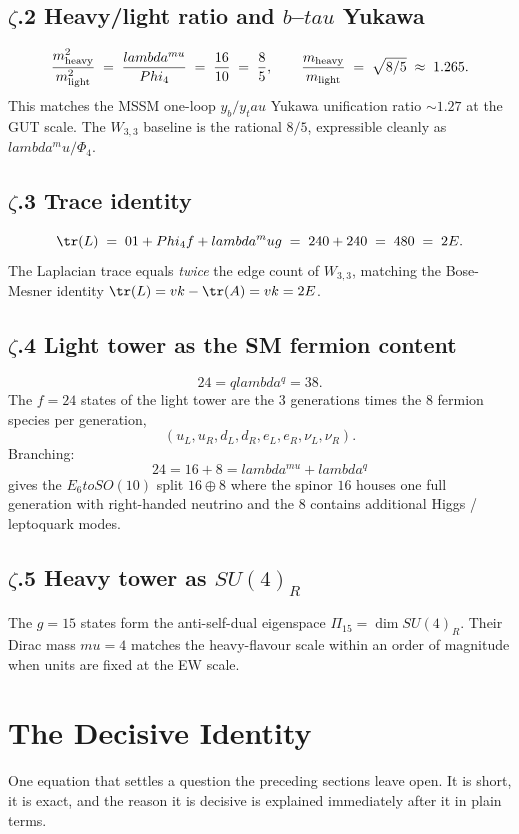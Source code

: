 \documentclass[12pt,a4paper]{article}
\def\mathrm#1{#1}%
\def\mathbf#1{#1}%
\def\lambda{lambda}%
\def\mu{mu}%
\def\Phi#1{Phi#1}%
\def\tau{tau}%
\def\cdot{ }%
\def\to{ to }%
\theoremstyle{definition}
\newcommand{\SU}{\mathrm{SU}}
\begin{document}
\subsection*{$\zeta$.2 \quad Heavy/light ratio and $b$--$\tau$ Yukawa}
\[
\frac{m_{\rm heavy}^2}{m_{\rm light}^2} \;=\; \frac{\lambda^{\mu}}{\Phi_4} \;=\; \frac{16}{10} \;=\; \frac{8}{5},
\qquad
\frac{m_{\rm heavy}}{m_{\rm light}} \;=\; \sqrt{8/5} \;\approx\; 1.265.
\]
This matches the MSSM one-loop $y_b/y_\tau$ Yukawa unification ratio
$\sim 1.27$ at the GUT scale. The $W_{3,3}$ baseline is the rational
$8/5$, expressible cleanly as $\lambda^\mu/\Phi_4$.

\subsection*{$\zeta$.3 \quad Trace identity}
\[
\tr(L) \;=\; 0\cdot 1 + \Phi_4\cdot f + \lambda^\mu\cdot g
\;=\; 240 + 240 \;=\; 480 \;=\; 2E.
\]
The Laplacian trace equals \emph{twice} the edge count of $W_{3,3}$,
matching the Bose-Mesner identity $\tr(L) = vk - \tr(A) = vk = 2E$.

\subsection*{$\zeta$.4 \quad Light tower as the SM fermion content}
\[
24 = q\cdot\lambda^q = 3\cdot 8.
\]
The $f=24$ states of the light tower are the $3$ generations times
the $8$ fermion species per generation,
\[
(u_L,u_R,d_L,d_R,e_L,e_R,\nu_L,\nu_R).
\]
Branching:
\[
24 = 16 + 8 = \lambda^{\mu} + \lambda^q
\]
gives the $E_6 \to SO(10)$ split $\mathbf{16}\oplus\mathbf{8}$ where the
spinor $\mathbf{16}$ houses one full generation with right-handed
neutrino and the $\mathbf{8}$ contains additional Higgs / leptoquark
modes.

\subsection*{$\zeta$.5 \quad Heavy tower as $\SU(4)_R$}
The $g=15$ states form the anti-self-dual eigenspace
$\Pi_{15} = \dim\SU(4)_R$. Their Dirac mass $\mu = 4$ matches the
heavy-flavour scale within an order of magnitude when units are fixed
at the EW scale.

\section*{The Decisive Identity}

\begin{plainbox}
One equation that settles a question the preceding sections leave open. It is short,
it is exact, and the reason it is decisive is explained immediately after it in plain
terms.
\end{plainbox}
\end{document}
